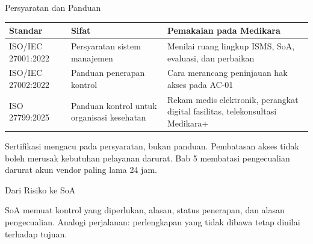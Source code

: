 \documentclass[aspectratio=169, table, 12pt]{beamer}
\begin{document}
\begin{frame}{{\Large Persyaratan dan Panduan}}
  \vspace{2pt}
  \footnotesize
  \begin{tabularx}{\textwidth}{|>{\raggedright\arraybackslash}p{}|>{\raggedright\arraybackslash}p{}|>{\raggedright\arraybackslash}X|}
    \hline
    \textbf{Standar} & \textbf{Sifat} & \textbf{Pemakaian pada Medikara} \\ \hline
    ISO/IEC 27001:2022 & Persyaratan sistem manajemen & Menilai ruang lingkup ISMS, SoA, evaluasi,
    dan perbaikan \\ \hline
    ISO/IEC 27002:2022 & Panduan penerapan kontrol & Cara merancang peninjauan hak akses pada AC-01
    \\ \hline
    ISO 27799:2025 & Panduan kontrol untuk organisasi kesehatan & Rekam medis elektronik, perangkat
    digital fasilitas, telekonsultasi Medikara+ \\ \hline
  \end{tabularx}

  \vspace{8pt}
  \small Sertifikasi mengacu pada persyaratan, bukan panduan. Pembatasan akses tidak boleh merusak
  kebutuhan pelayanan darurat. Bab 5 membatasi pengecualian darurat akun vendor paling lama 24 jam.
\end{frame}

\begin{frame}{{\Large Dari Risiko ke SoA}}
  \vspace{6pt}
  \begin{center}
    \resizebox{0.95\textwidth}{!}{}
  \end{center}
  \small SoA memuat kontrol yang diperlukan, alasan, status penerapan, dan alasan pengecualian.
  Analogi perjalanan: perlengkapan yang tidak dibawa tetap dinilai terhadap tujuan.
\end{frame}
\end{document}
